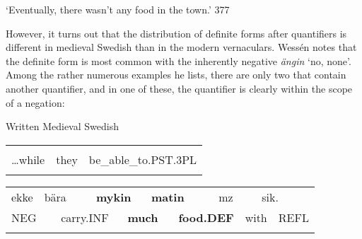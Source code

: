 \begin{styleTranslation}
‘Eventually, there wasn’t any food in the town.’ 377

\end{styleTranslation}

\begin{styleBodyTextFirst}
However, it turns out that the distribution of definite forms after quantifiers is different in medieval Swedish than in the modern vernaculars. Wessén notes that the definite form is most common with the inherently negative \textit{ängin} ‘no, none’. Among the rather numerous examples he lists, there are only two that contain another quantifier, and in one of these, the quantifier is clearly within the scope of a negation: 

\end{styleBodyTextFirst}

\begin{listWWNumileveli}
\item 

\begin{styleExample}
Written Medieval Swedish

\end{styleExample}

\end{listWWNumileveli}

\begin{tabular}{lll}
\lsptoprule
\multicolumn{3}{l}{…medhan

}\\
…while & they & be\_able\_to.PST.3PL\\
\lspbottomrule
\end{tabular}

\begin{tabular}{llllllllllll}
\lsptoprule
ekke & \multicolumn{2}{l}{bära

} & \multicolumn{2}{l}{{\bfseries mykin}

} & \multicolumn{2}{l}{{\bfseries matin}

} & \multicolumn{2}{l}{mz

} & \multicolumn{2}{l}{sik.

} & \\
\multicolumn{2}{l}{NEG

} & \multicolumn{2}{l}{carry.INF

} & \multicolumn{2}{l}{{\bfseries much}

} & \multicolumn{2}{l}{{\bfseries food.DEF}

} & \multicolumn{2}{l}{with

} & \multicolumn{2}{l}{REFL

}\\
\lspbottomrule
\end{tabular}

